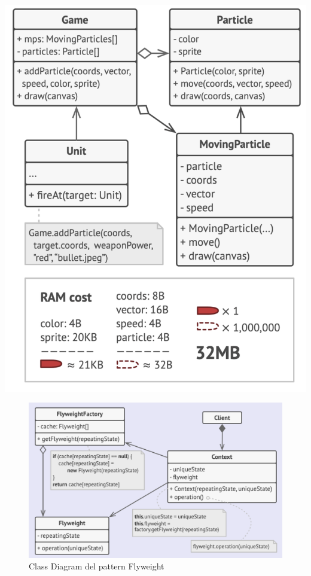 \begin{minipage}{0.5\linewidth}
    \includegraphics[width=1\linewidth]{assets/pattern/flyweight/flyweight-esempio.png}
\end{minipage}

\begin{figure}[H]
    \centering
    \includegraphics[width=1\linewidth]{assets/pattern/flyweight/flyweight-struttura.png}
    \caption{Class Diagram del pattern Flyweight}
\end{figure}

